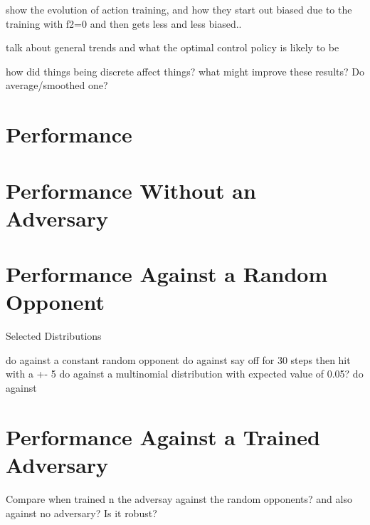 \documentclass[../main.tex]{subfiles}
\begin{document}
show the evolution of action training, and how they start out biased due to the training with f2=0 and then gets less and less biased..

talk about general trends and what the optimal control policy is likely to be

how did things being discrete affect things? what might improve these results? Do average/smoothed one?

\section{Performance}

\section{Performance Without an Adversary}


\section{Performance Against a Random Opponent}
Selected Distributions

do against a constant random opponent
do against say off for 30 steps then hit with a +- 5
do against a multinomial distribution with expected value of 0.05?
do against

\section{Performance Against a Trained Adversary}

Compare when trained n the adversay against the random opponents? and also against no adversary? Is it robust?
\end{document}
